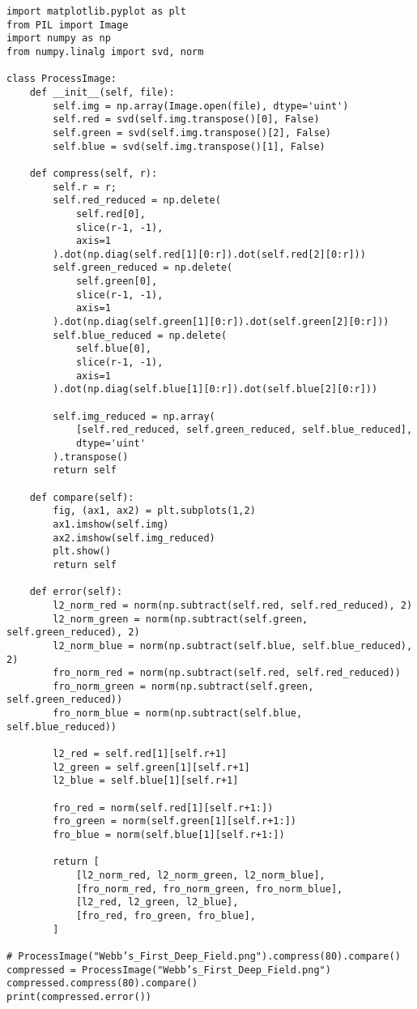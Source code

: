 \documentclass[12pt, letterpaper]{article}
\begin{document}
\begin{verbatim}
import matplotlib.pyplot as plt
from PIL import Image
import numpy as np
from numpy.linalg import svd, norm

class ProcessImage:
    def __init__(self, file):
        self.img = np.array(Image.open(file), dtype='uint')
        self.red = svd(self.img.transpose()[0], False)
        self.green = svd(self.img.transpose()[2], False)
        self.blue = svd(self.img.transpose()[1], False)

    def compress(self, r):
        self.r = r;
        self.red_reduced = np.delete(
            self.red[0],
            slice(r-1, -1),
            axis=1
        ).dot(np.diag(self.red[1][0:r]).dot(self.red[2][0:r]))
        self.green_reduced = np.delete(
            self.green[0],
            slice(r-1, -1),
            axis=1
        ).dot(np.diag(self.green[1][0:r]).dot(self.green[2][0:r]))
        self.blue_reduced = np.delete(
            self.blue[0],
            slice(r-1, -1),
            axis=1
        ).dot(np.diag(self.blue[1][0:r]).dot(self.blue[2][0:r]))

        self.img_reduced = np.array(
            [self.red_reduced, self.green_reduced, self.blue_reduced],
            dtype='uint'
        ).transpose()
        return self

    def compare(self):
        fig, (ax1, ax2) = plt.subplots(1,2)
        ax1.imshow(self.img)
        ax2.imshow(self.img_reduced)
        plt.show()
        return self

    def error(self):
        l2_norm_red = norm(np.subtract(self.red, self.red_reduced), 2)
        l2_norm_green = norm(np.subtract(self.green, self.green_reduced), 2)
        l2_norm_blue = norm(np.subtract(self.blue, self.blue_reduced), 2)
        fro_norm_red = norm(np.subtract(self.red, self.red_reduced))
        fro_norm_green = norm(np.subtract(self.green, self.green_reduced))
        fro_norm_blue = norm(np.subtract(self.blue, self.blue_reduced))

        l2_red = self.red[1][self.r+1]
        l2_green = self.green[1][self.r+1]
        l2_blue = self.blue[1][self.r+1]

        fro_red = norm(self.red[1][self.r+1:])
        fro_green = norm(self.green[1][self.r+1:])
        fro_blue = norm(self.blue[1][self.r+1:])

        return [
            [l2_norm_red, l2_norm_green, l2_norm_blue],
            [fro_norm_red, fro_norm_green, fro_norm_blue],
            [l2_red, l2_green, l2_blue],
            [fro_red, fro_green, fro_blue],
        ]

# ProcessImage("Webb’s_First_Deep_Field.png").compress(80).compare()
compressed = ProcessImage("Webb’s_First_Deep_Field.png")
compressed.compress(80).compare()
print(compressed.error())
\end{verbatim}
\end{document}
